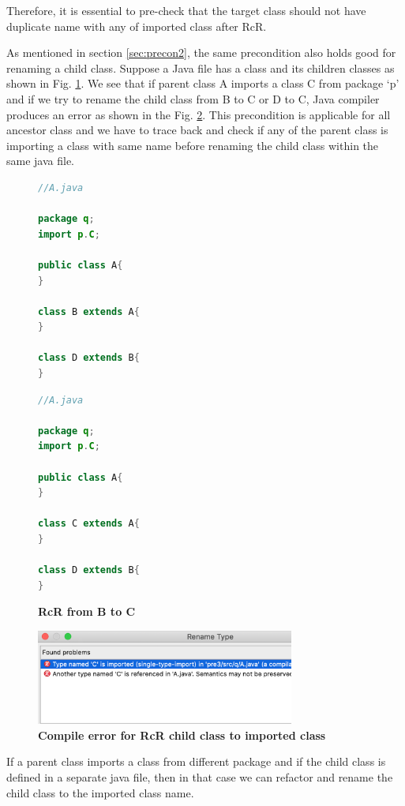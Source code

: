 Therefore, it is essential to pre-check that the target class should not have duplicate name with any of imported class after RcR.


As mentioned in  section \ref{sec:precon2}, the same precondition also holds good for renaming a child class. Suppose a Java file has a class and its children classes as shown in Fig. \ref{figure:figpc3_1}. We see that if parent class A imports a class C from package `p' and if we try to rename the child class from B to C or D to C, Java compiler produces an error as shown in the Fig. \ref{figure:figpc3_2}.  This precondition is applicable for all ancestor class and we have to trace back and check if any of the parent class is importing a class with same name before renaming the child class within the same java file.

\begin{figure}[th]
\centering
\begin{minipage}[t]{0.45\linewidth}
\begin{lstlisting}[language=java, basicstyle=\scriptsize\ttfamily,frame=single]	
//A.java

package q;
import p.C;

public class A{	
}

class B extends A{	
}

class D extends B{
}
\end{lstlisting}
\end{minipage}
\hfill
\begin{minipage}[t]{0.45\linewidth}
\begin{lstlisting}[language=java, basicstyle=\scriptsize\ttfamily,frame=single]
//A.java

package q;
import p.C;

public class A{	
}

class C extends A{	
}

class D extends B{
}	
\end{lstlisting}
\end{minipage}
\caption{\textbf{RcR from B to C}}
\label{figure:figpc3_1}
\end{figure}

\begin{figure}[htbp]
\centerline{\includegraphics[width=85mm,scale=0.5]{precond3.png}}
\caption{\textbf{Compile error for RcR child class to imported class}}
\label{figure:figpc3_2}
\end{figure}


If a parent class imports a class from different package and if the child class is defined in a separate java file, then in that case we can refactor and rename the child class to the imported class name.
